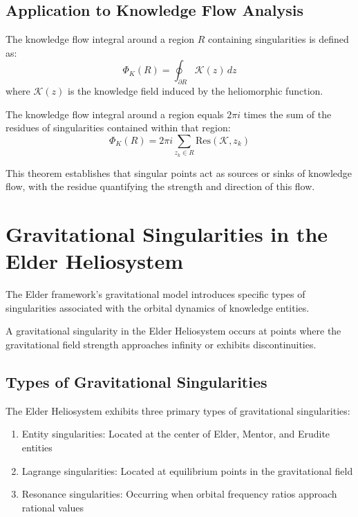 \begin{definition}
\begin{enumerate}
\subsection{Application to Knowledge Flow Analysis}

\begin{definition}
The knowledge flow integral around a region $R$ containing singularities is defined as:
\begin{equation}
\Phi_K(R) = \oint_{\partial R} \mathcal{K}(z) \, dz
\end{equation}
where $\mathcal{K}(z)$ is the knowledge field induced by the heliomorphic function.
\end{definition}

\begin{theorem}
The knowledge flow integral around a region equals $2\pi i$ times the sum of the residues of singularities contained within that region:
\begin{equation}
\Phi_K(R) = 2\pi i \sum_{z_k \in R} \text{Res}(\mathcal{K}, z_k)
\end{equation}
\end{theorem}

This theorem establishes that singular points act as sources or sinks of knowledge flow, with the residue quantifying the strength and direction of this flow.

\section{Gravitational Singularities in the Elder Heliosystem}

The Elder framework's gravitational model introduces specific types of singularities associated with the orbital dynamics of knowledge entities.

\begin{definition}
A gravitational singularity in the Elder Heliosystem occurs at points where the gravitational field strength approaches infinity or exhibits discontinuities.
\end{definition}

\subsection{Types of Gravitational Singularities}

\begin{theorem}
The Elder Heliosystem exhibits three primary types of gravitational singularities:
\begin{enumerate}
    \item Entity singularities: Located at the center of Elder, Mentor, and Erudite entities
    \item Lagrange singularities: Located at equilibrium points in the gravitational field
    \item Resonance singularities: Occurring when orbital frequency ratios approach rational values
\end{enumerate}
\end{theorem}


\end{enumerate}
\end{definition}
